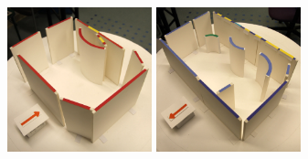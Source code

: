 \begin{figure}[t]
\begin{minipage}[c]{3.33in}
  \includegraphics[width=1.65in]{../gi2012_userstudy/images/photos/38_renovation} %
  \includegraphics[width=1.65in]{../gi2012_userstudy/images/photos/42_renovation} %
\end{minipage}
\begin{minipage}[c]{4.9in}


\end{minipage}
\end{figure}
